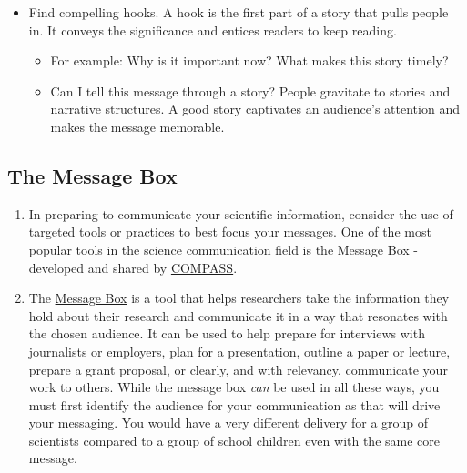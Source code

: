 \documentclass[
]{book}
\providecommand{\tightlist}{%
  \setlength{\itemsep}{0pt}\setlength{\parskip}{0pt}}
\begin{document}
\begin{enumerate}
\begin{itemize}
    \begin{itemize}
    \tightlist
    \item
      Find compelling hooks. A hook is the first part of a story that pulls people in. It conveys the significance and entices readers to keep reading.

      \begin{itemize}
      \tightlist
      \item
        For example: Why is it important now? What makes this story timely?
      \item
        Can I tell this message through a story? People gravitate to stories and narrative structures. A good story captivates an audience's attention and makes the message memorable.
      \end{itemize}
    \end{itemize}
  \end{itemize}
\end{enumerate}

\hypertarget{the-message-box}{%
\subsection{The Message Box}\label{the-message-box}}

\begin{enumerate}
\def\labelenumi{\arabic{enumi}.}
\item
  In preparing to communicate your scientific information, consider the use of targeted tools or practices to best focus your messages. One of the most popular tools in the science communication field is the Message Box - developed and shared by \href{https://www.compassscicomm.org/about-us/}{COMPASS}.
\item
  The \href{https://www.compassscicomm.org/leadership-development/the-message-box/}{Message Box} is a tool that helps researchers take the information they hold about their research and communicate it in a way that resonates with the chosen audience. It can be used to help prepare for interviews with journalists or employers, plan for a presentation, outline a paper or lecture, prepare a grant proposal, or clearly, and with relevancy, communicate your work to others. While the message box \emph{can} be used in all these ways, you must first identify the audience for your communication as that will drive your messaging. You would have a very different delivery for a group of scientists compared to a group of school children even with the same core message.
\end{enumerate}
\end{document}
